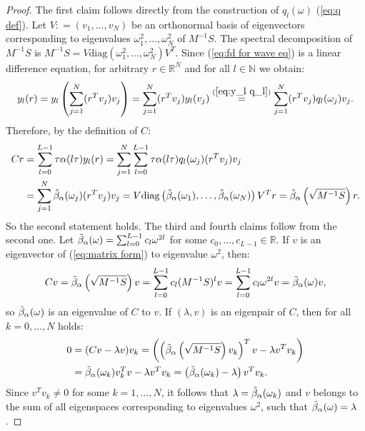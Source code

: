 \documentclass[a4paper,11pt,bibliography=totoc,listof=totoc,headinclude=true,cleardoublepage=empty,oneside]{scrbook}
\newcommand{\R}{\mathbb{R}}
\newcommand{\N}{\mathbb{N}}
\newcommand{\dff}{\Tilde{\beta}_\alpha}
\renewcommand{\eqref}[1]{(\ref{#1})}
\begin{document}
\begin{proof}
    The first claim follows directly from the construction of $q_l(\omega)$ \eqref{eq:q def}. Let $V: = (v_1, \dots, v_N)$ be an orthonormal basis of eigenvectors corresponding to eigenvalues $\omega_1^2, \dots, \omega_N^2$ of $M^{-1}S$. The spectral decomposition of $M^{-1}S$ is $M^{-1}S = V \mathrm{diag}(\omega_1^2, \dots, \omega_N^2) V^T$. Since \eqref{eq:fd for wave eq} is a linear difference equation, for arbitrary $r\in\R^N$ and for all $l\in \N$ we obtain:
    \begin{equation*}
        y_l(r) = y_l \left( \sum_{j=1}^N (r^T v_j)v_j \right) = \sum_{j=1}^N (r^T v_j)y_l(v_j) \stackrel{\eqref{eq:y_l q_l}}{=} \sum_{j=1}^N (r^T v_j)q_l(\omega_j)v_j.
    \end{equation*}
    Therefore, by the definition of $C$:
    \begin{align*}
        Cr &= \sum_{l=0}^{L-1} \tau\alpha(l\tau) y_l(r) = \sum_{j=1}^N \sum_{l=0}^{L-1} \tau\alpha(l\tau)q_l(\omega_j) (r^T v_j) v_j \\ &= \sum_{j=1}^{N}\dff(\omega_j)(r^Tv_j)v_j = V \mathrm{diag}\left(\dff(\omega_1), \dots, \dff(\omega_N)\right)V^Tr = \dff\left(\sqrt{M^{-1} S}\right)r.
    \end{align*}
    So the second statement holds. The third and fourth claims follow from the second one. Let $\dff(\omega) = \sum_{l=0}^{L-1} c_l \omega^{2l}$ for some $c_0, \dots, c_{L-1}\in \R$. If $v$ is an eigenvector of \eqref{eq:matrix form} to eigenvalue $\omega^2$, then:
    \begin{equation*}
        Cv = \dff\left(\sqrt{M^{-1}S}\right)v = \sum_{l=0}^{L-1} c_l (M^{-1}S)^{l}v = \sum_{l=0}^{L-1} c_l \omega^{2l}v = \dff(\omega)v,
    \end{equation*}
    so $\dff(\omega)$ is an eigenvalue of $C$ to $v$. If $(\lambda, v)$ is an eigenpair of $C$, then for all $k=0,\dots, N$ holds:
    \begin{align*}
        0 &= (Cv - \lambda v)v_k = \left(\left(\dff\left(\sqrt{M^{-1}S}\right)v_k\right)^Tv - \lambda v^T v_k\right) \\&= \dff(\omega_k)v_k^T v - \lambda v^T v_k = \left(\dff(\omega_k) - \lambda\right)v^T v_k.
    \end{align*}
    Since $v^Tv_k \neq 0$ for some $k=1, \dots, N$, it follows that $\lambda = \dff(\omega_k)$ and $v$ belongs to the sum of all eigenspaces corresponding to eigenvalues $\omega^2$, such that $\dff(\omega) = \lambda$.
\end{proof}
\end{document}

